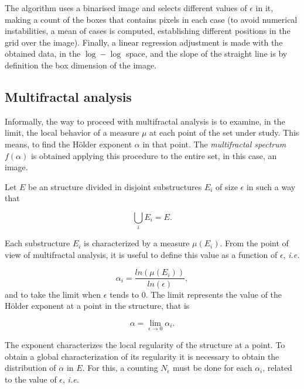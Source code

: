 The algorithm uses a binarised image and selects different values of $\epsilon$ in it, making a count of the boxes that contains pixels in each case (to avoid numerical instabilities, a mean of cases is computed, establishing different positions in the grid over the image). Finally, a linear regression adjustment is made with the obtained data, in the $\log-\log$ space, and the slope of the straight line is by definition the box dimension of the image. %


\subsection{Multifractal analysis}
\label{sec:4}

Informally, the way to proceed with multifractal analysis is to examine, in the limit, the local behavior of a measure $\mu$ at each point of the set under study. This means, to find the H\"older exponent $\alpha$ in that point. The {\em multifractal spectrum} $f(\alpha)$ is obtained applying this procedure to the entire set, in this case, an image.

Let $E$ be an structure divided in disjoint substructures $E_{i}$ of size $\epsilon$ in such a way that 

\begin{equation}
\displaystyle\bigcup_{i}E_{i} = E.
\end{equation}

Each substructure $E_{i}$ is characterized by a measure $\mu(E_{i})$. From the point of view of multifractal analysis, it is useful to define this value as a function of $\epsilon$, {\em i.e.}


\begin{equation}
\alpha_{i} = \frac{ln(\mu(E_{i}))}{ln(\epsilon)},
\label{eqn:eqn4}
\end{equation}
\noindent
and to take the limit when $\epsilon$ tends to $0$. The limit represents the value of the H\"older exponent at a point in the structure, that is

\begin{equation}
\alpha = \lim_{\epsilon\to0}{\alpha_{i}}.
\label{eqn:eqn5}
\end{equation}

The exponent characterizes the local regularity of the structure at a point. To obtain a global characterization of its regularity it is necessary to obtain the distribution of $\alpha$ in $E$. For this, a counting $N_{\epsilon}$ must be done for each $\alpha_{i}$, related to the value of $\epsilon$, {\em i.e.}

